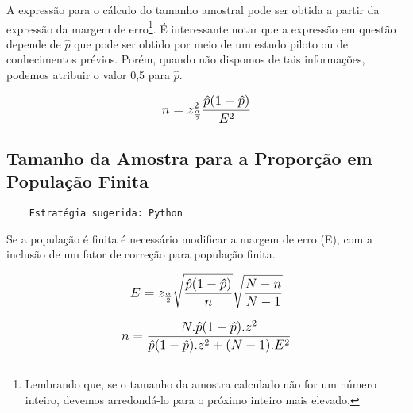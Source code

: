 A expressão para o cálculo do tamanho amostral pode ser obtida a partir da
expressão da margem de erro\footnote{Lembrando que, se o tamanho da amostra calculado não for um número inteiro, devemos arredondá-lo para o próximo inteiro mais elevado.}. É interessante notar que a expressão em questão depende de \(\hat{p}\) que pode ser obtido por meio de um estudo piloto ou de conhecimentos prévios. Porém, quando não dispomos de tais informações, podemos atribuir o valor 0,5 para \(\hat{p}\).

\[\beq{ n = z^2_\frac{\alpha}{2}\frac{\hat{p}(1-\hat{p})}{E^2} }\]

\subsection{Tamanho da Amostra para a Proporção em População Finita}

\begin{verbatim}
	Estratégia sugerida: Python
\end{verbatim}

Se a população é finita é necessário modificar a margem de erro (E), com a inclusão de um fator de correção para população finita.

\[\beq{ E = z_\frac{\alpha}{2}\sqrt{\frac{\hat{p}(1-\hat{p})}{n}}\sqrt{\frac{N-n}{N-1}} }\]

\[\beq{ n = \frac{N.\hat{p}(1-\hat{p}).z^2}{\hat{p}(1-\hat{p}).z^2+(N-1).E^2} }\]
